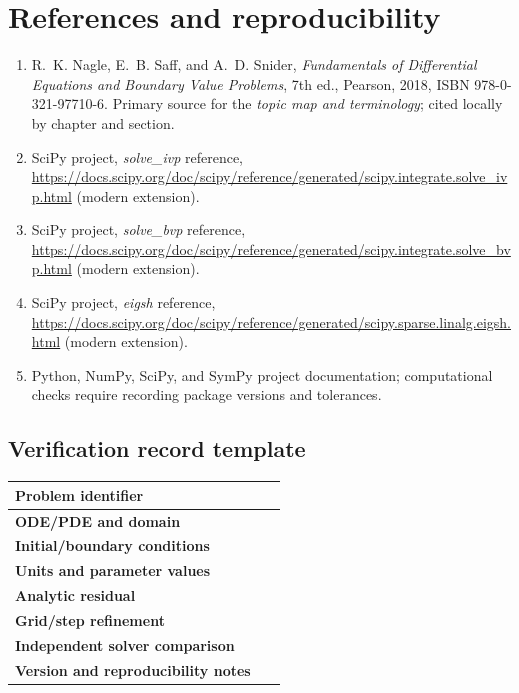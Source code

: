 \documentclass[11pt,letterpaper,oneside]{report}
\theoremstyle{definition}\newtheorem{definition}[theorem]{Definition}
\theoremstyle{remark}\newtheorem{remark}[theorem]{Remark}
\begin{document}
\appendix
\chapter{References and reproducibility}
\begin{enumerate}
\item R.~K. Nagle, E.~B. Saff, and A.~D. Snider, \emph{Fundamentals of Differential Equations and Boundary Value Problems}, 7th ed., Pearson, 2018, ISBN 978-0-321-97710-6. Primary source for the \emph{topic map and terminology}; cited locally by chapter and section.
\item SciPy project, \emph{solve\_ivp} reference, \url{https://docs.scipy.org/doc/scipy/reference/generated/scipy.integrate.solve_ivp.html} (modern extension).
\item SciPy project, \emph{solve\_bvp} reference, \url{https://docs.scipy.org/doc/scipy/reference/generated/scipy.integrate.solve_bvp.html} (modern extension).
\item SciPy project, \emph{eigsh} reference, \url{https://docs.scipy.org/doc/scipy/reference/generated/scipy.sparse.linalg.eigsh.html} (modern extension).
\item Python, NumPy, SciPy, and SymPy project documentation; computational checks require recording package versions and tolerances.
\end{enumerate}
\section*{Verification record template}
\begin{tabularx}{\textwidth}{>{\bfseries}p{}X}\toprule
Problem identifier & \rule{0pt}{15pt}\ \\ \midrule
ODE/PDE and domain & \\[8pt]
Initial/boundary conditions & \\[8pt]
Units and parameter values & \\[8pt]
Analytic residual & \\ [8pt]
Grid/step refinement & \\ [8pt]
Independent solver comparison & \\ [8pt]
Version and reproducibility notes & \\ [8pt]\bottomrule
\end{tabularx}
\end{document}
